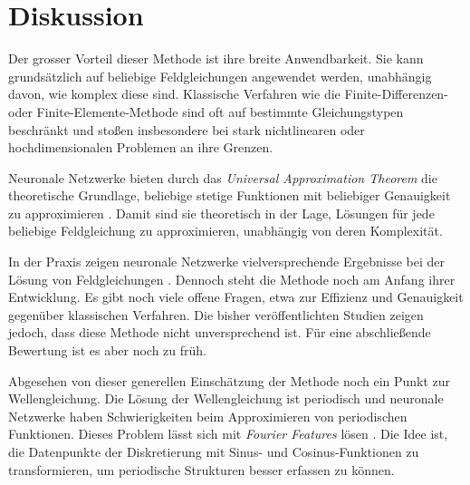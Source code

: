 %
%
%
%

\section{Diskussion\label{neuronal:section:diskussion}}

Der grosser Vorteil dieser Methode ist ihre breite Anwendbarkeit.
Sie kann grundsätzlich auf beliebige Feldgleichungen angewendet werden, unabhängig davon, wie komplex diese sind.
Klassische Verfahren wie die Finite-Differenzen- oder Finite-Elemente-Methode sind oft auf bestimmte Gleichungstypen beschränkt und stoßen insbesondere bei stark nichtlinearen oder hochdimensionalen Problemen an ihre Grenzen.

Neuronale Netzwerke bieten durch das \emph{Universal Approximation Theorem} die theoretische Grundlage, beliebige stetige Funktionen mit beliebiger Genauigkeit zu approximieren \cite{neuronal:universal_approximation_theorem}. 
Damit sind sie theoretisch in der Lage, Lösungen für jede beliebige Feldgleichung zu approximieren, unabhängig von deren Komplexität.

In der Praxis zeigen neuronale Netzwerke vielversprechende Ergebnisse bei der Lösung von Feldgleichungen \cite{neuronal:pinns}. 
Dennoch steht die Methode noch am Anfang ihrer Entwicklung. 
Es gibt noch viele offene Fragen, etwa zur Effizienz und Genauigkeit gegenüber klassischen Verfahren.
Die bisher veröffentlichten Studien zeigen jedoch, dass diese Methode nicht unversprechend ist.
Für eine abschließende Bewertung ist es aber noch zu früh. 

Abgesehen von dieser generellen Einschätzung der Methode noch ein Punkt zur Wellengleichung.
Die Lösung der Wellengleichung ist periodisch und neuronale Netzwerke haben Schwierigkeiten beim Approximieren von periodischen Funktionen.
Dieses Problem lässt sich mit \emph{Fourier Features} lösen \cite{neuronal:fourier_features}.
Die Idee ist, die Datenpunkte der Diskretierung mit Sinus- und Cosinus-Funktionen zu transformieren, um periodische Strukturen besser erfassen zu können.
